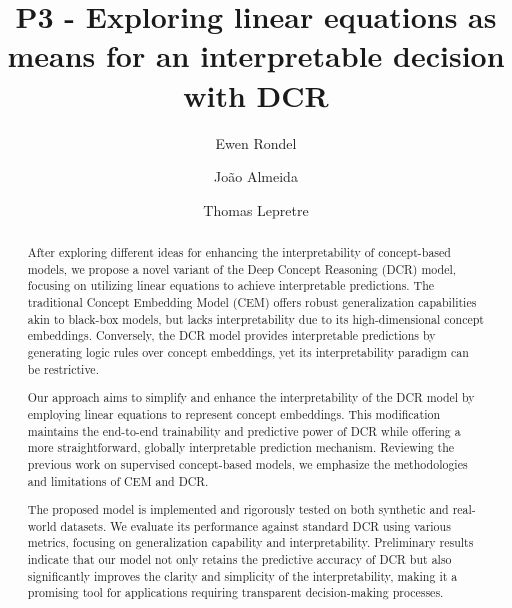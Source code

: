 \documentclass[sigconf, nonacm]{acmart}
\begin{document}
\title{P3 - Exploring linear equations as means for an interpretable decision with DCR}

\author{Ewen Rondel}

\author{João Almeida}
\author{Thomas Lepretre}



\begin{abstract}
After exploring different ideas for enhancing the interpretability of concept-based models, we propose a novel variant of the Deep Concept Reasoning (DCR) model, focusing on utilizing linear equations to achieve interpretable predictions. The traditional Concept Embedding Model (CEM) offers robust generalization capabilities akin to black-box models, but lacks interpretability due to its high-dimensional concept embeddings. Conversely, the DCR model provides interpretable predictions by generating logic rules over concept embeddings, yet its interpretability paradigm can be restrictive.

Our approach aims to simplify and enhance the interpretability of the DCR model by employing linear equations to represent concept embeddings. This modification maintains the end-to-end trainability and predictive power of DCR while offering a more straightforward, globally interpretable prediction mechanism. Reviewing the previous work on supervised concept-based models, we emphasize the methodologies and limitations of CEM and DCR.

The proposed model is implemented and rigorously tested on both synthetic and real-world datasets. We evaluate its performance against standard DCR using various metrics, focusing on generalization capability and interpretability. Preliminary results indicate that our model not only retains the predictive accuracy of DCR but also significantly improves the clarity and simplicity of the interpretability, making it a promising tool for applications requiring transparent decision-making processes.
\end{abstract}
\end{document}
